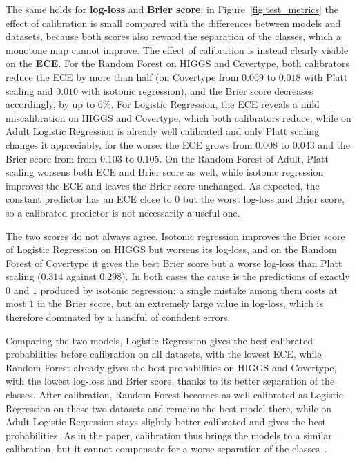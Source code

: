 \documentclass[a4paper, 10pt]{article}
\begin{document}
The same holds for \textbf{log-loss} and \textbf{Brier score}: in Figure~\ref{fig:test_metrics} the effect of calibration is small compared with the differences between models and datasets, because both scores also reward the separation of the classes, which a monotone map cannot improve. The effect of calibration is instead clearly visible on the \textbf{ECE}. For the Random Forest on HIGGS and Covertype, both calibrators reduce the ECE by more than half (on Covertype from $0.069$ to $0.018$ with Platt scaling and $0.010$ with isotonic regression), and the Brier score decreases accordingly, by up to 6\%. For Logistic Regression, the ECE reveals a mild miscalibration on HIGGS and Covertype, which both calibrators reduce, while on Adult Logistic Regression is already well calibrated and only Platt scaling changes it appreciably, for the worse: the ECE grows from $0.008$ to $0.043$ and the Brier score from from $0.103$ to $0.105$. On the Random Forest of Adult, Platt scaling worsens both ECE and Brier score as well, while isotonic regression improves the ECE and leaves the Brier score unchanged. As expected, the constant predictor has an ECE close to $0$ but the worst log-loss and Brier score, so a calibrated predictor is not necessarily a useful one.

The two scores do not always agree. Isotonic regression improves the Brier score of Logistic Regression on HIGGS but worsens its log-loss, and on the Random Forest of Covertype it gives the best Brier score but a worse log-loss than Platt scaling ($0.314$ against $0.298$). In both cases the cause is the predictions of exactly $0$ and $1$ produced by isotonic regression: a single mistake among them costs at most $1$ in the Brier score, but an extremely large value in log-loss, which is therefore dominated by a handful of confident errors. 

Comparing the two models, Logistic Regression gives the best-calibrated probabilities before calibration on all datasets, with the lowest ECE, while Random Forest already gives the best probabilities on HIGGS and Covertype, with the lowest log-loss and Brier score, thanks to its better separation of the classes. After calibration, Random Forest becomes as well calibrated as Logistic Regression on these two datasets and remains the best model there, while on Adult Logistic Regression stays slightly better calibrated and gives the best probabilities. As in the paper, calibration thus brings the models to a similar calibration, but it cannot compensate for a worse separation of the classes~\cite{niculescu2005predicting}.
 
\end{document}
